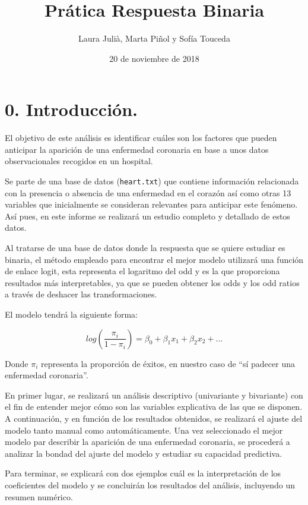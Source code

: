 \documentclass[]{article}
\title{Prática Respuesta Binaria}
\author{Laura Julià, Marta Piñol y Sofía Touceda}
\date{20 de noviembre de 2018}
\begin{document}
\maketitle

{
\setcounter{tocdepth}{2}
\tableofcontents
}
\section{0. Introducción.}\label{introduccion.}

El objetivo de este análisis es identificar cuáles son los factores que
pueden anticipar la aparición de una enfermedad coronaria en base a unos
datos observacionales recogidos en un hospital.

Se parte de una base de datos (\texttt{heart.txt}) que contiene
información relacionada con la presencia o absencia de una enfermedad en
el corazón así como otras 13 variables que inicialmente se consideran
relevantes para anticipar este fenómeno. Así pues, en este informe se
realizará un estudio completo y detallado de estos datos.

Al tratarse de una base de datos donde la respuesta que se quiere
estudiar es binaria, el método empleado para encontrar el mejor modelo
utilizará una función de enlace logit, esta representa el logaritmo del
odd y es la que proporciona resultados más interpretables, ya que se
pueden obtener los odds y los odd ratios a través de deshacer las
transformaciones.

El modelo tendrá la siguiente forma:

\[log(\frac{\pi_i}{1-\pi_i}) = \beta_0 + \beta_1x_1 + \beta_2x_2 + ...\]

Donde \(\pi_i\) representa la proporción de éxitos, en nuestro caso de
``sí padecer una enfermedad coronaria''.

En primer lugar, se realizará un análisis descriptivo (univariante y
bivariante) con el fin de entender mejor cómo son las variables
explicativa de las que se disponen. A continuación, y en función de los
resultados obtenidos, se realizará el ajuste del modelo tanto manual
como automáticamente. Una vez seleccionado el mejor modelo par describir
la aparición de una enfermedad coronaria, se procederá a analizar la
bondad del ajuste del modelo y estudiar su capacidad predictiva.

Para terminar, se explicará con dos ejemplos cuál es la interpretación
de los coeficientes del modelo y se concluirán los resultados del
análisis, incluyendo un resumen numérico.
\end{document}
